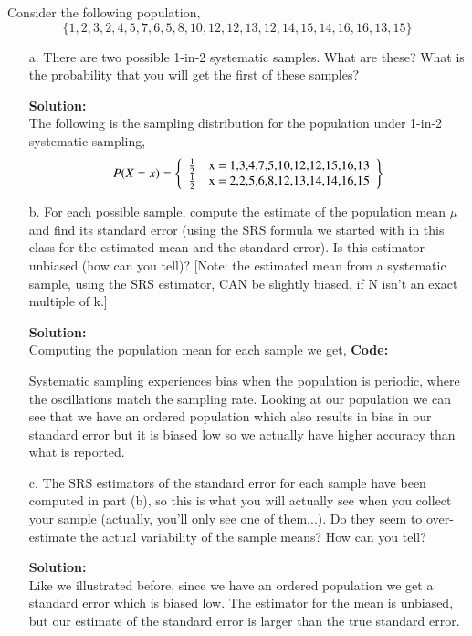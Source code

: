 \documentclass[12pt]{article}
\makeatletter
\theoremstyle{homework}
\newenvironment{exercise}[1]
{\def\@currentlabel{#1}\exercisecore}
{\endexercisecore}
\newcommand{\localhead}[1]{\par\smallskip\noindent\textbf{#1}\nobreak\\}%
\newcommand\solution{\localhead{Solution:}}
\makeatother
\begin{document}
\begin{exercise}{2} Consider the following population, 
    \begin{equation*}
        \lbrace 1,2,3,2,4,5,7,6,5,8,10,12,12,13,12,14,15,14,16,16,13,15 \rbrace
    \end{equation*}
    \begin{enumerate}
        \item[a.] There are two possible 1-in-2 systematic samples. What are these? What is the
        probability that you will get the first of these samples?\\
        \solution The following is the sampling distribution for the population under  1-in-2 systematic sampling, 
   \begin{equation*}
        P(X = x) = \left\{\begin{array}{lr}
            \frac{1}{2} & $x = 1,3,4,7,5,10,12,12,15,16,13$ \\
            \frac{1}{2} & $x = 2,2,5,6,8,12,13,14,14,16,15$ 
            \end{array}\right\} 
   \end{equation*}
        
\vspace{.15in}


        \item[b.]   For each possible sample, compute the estimate of the population mean 
        $\mu$ and find its standard error (using the SRS formula we started with in this 
        class for the estimated mean and the standard error). 
        Is this estimator unbiased (how can you tell)? [Note: the 
        estimated mean from a systematic sample, using the SRS estimator, 
        CAN be slightly biased, if N isn’t an exact multiple of k.]\\
        \solution Computing the population mean for each sample we get, 
        \textbf{Code:}
        \begin{center}
           
        \end{center}
        Systematic sampling experiences bias when the population is periodic, where the oscillations 
        match the sampling rate. Looking at our population we can see that we have an ordered population 
        which also results in bias in our standard error but it is biased low so we actually have higher accuracy than 
        what is reported. 
\vspace{.15in}

        \item[c.]  The SRS estimators of the standard error for each sample have been
         computed in part (b), so this is what you will actually see when you collect your
          sample (actually, you’ll only see one of them...). Do they seem to over-estimate 
          the actual variability of the sample means? How can you tell?\\
          \solution Like we illustrated before, since we have an ordered population we get a standard error which 
          is biased low. The estimator for the mean is unbiased, but our estimate of the standard error is larger than 
          the true standard error. 



\end{enumerate}
\end{exercise}
\end{document}
